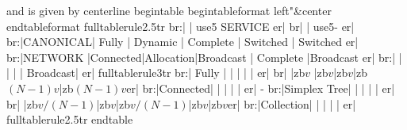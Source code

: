and is given by
\begingroup \eightpoint
\beginttverbatim
\1centerline{
\1begintable
\1begintableformat 
 \1left"&\1center
\1endtableformat
\1fulltablerule{2.5\1tr}
\1br{\1:\1|}        \1| \1use{5}                SERVICE                      \1er{\1|}
\1br{\1|}          \1| \1use{5}\1-                                           \1er{\1|}
\1br{\1:\1|}CANONICAL\1| Fully  | Dynamic  | Complete | Switched | Switched \1er{\1|}
\1br{\1:\1|}NETWORK \1|Connected|Allocation|Broadcast | Complete |Broadcast \1er{\1|}
\1br{\1:\1|}        \1|         |          |          | Broadcast|          \1er{\1|}
\1fulltablerule{3\1tr}%
\1br{\1:\1|} Fully  \1|         |          |          |          |          \1er{\1|}
\1br{\1|}          \1|\1zb{$v$} |\1zb{$v$}|\1zb{$v$}|\1zb{$(N-1)v$}|\1zb{$(N-1)v$}\1er{\1|}
\1br{\1:\1|}Connected\1|        |          |          |          |          \1er{\1|}
\1- %
\1br{\1:\1|}Simplex Tree\1|     |          |          |          |          \1er{\1|}
\1br{\1|}       \1|\1zb{$v/(N-1)$}|\1zb{$v$}|\1zb{$v/(N-1)$}|\1zb{$v$}|\1zb{$v$}\1er{\1|}
\1br{\1:\1|}Collection\1|       |          |          |          |          \1er{\1|}
\1fulltablerule{2.5\1tr} %
\1endtable
}
\endttverbatim
\endgroup
\ejectpage

\endblockmode
\done